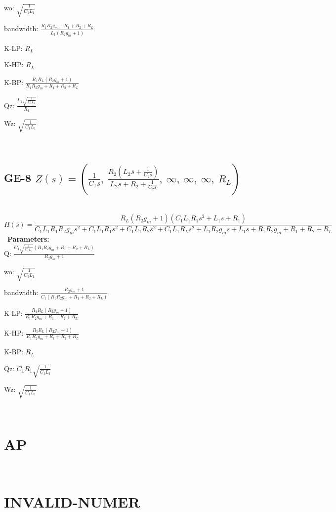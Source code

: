 \documentclass{article}
\begin{document}
wo: $\sqrt{\frac{1}{C_{1} L_{1}}}$\ 

bandwidth: $\frac{R_{1} R_{2} g_{m} + R_{1} + R_{2} + R_{L}}{L_{1} \left(R_{2} g_{m} + 1\right)}$\ 

K-LP: $R_{L}$\ 

K-HP: $R_{L}$\ 

K-BP: $\frac{R_{1} R_{L} \left(R_{2} g_{m} + 1\right)}{R_{1} R_{2} g_{m} + R_{1} + R_{2} + R_{L}}$\ 

Qz: $\frac{L_{1} \sqrt{\frac{1}{C_{1} L_{1}}}}{R_{1}}$\ 

Wz: $\sqrt{\frac{1}{C_{1} L_{1}}}$\ 

\ 

\subsection{GE-8 $Z(s) = \left( \frac{1}{C_{1} s}, \  \frac{R_{2} \left(L_{2} s + \frac{1}{C_{2} s}\right)}{L_{2} s + R_{2} + \frac{1}{C_{2} s}}, \  \infty, \  \infty, \  \infty, \  R_{L}\right)$ } \ 
\textbf{\[H(s) = \frac{R_{L} \left(R_{2} g_{m} + 1\right) \left(C_{1} L_{1} R_{1} s^{2} + L_{1} s + R_{1}\right)}{C_{1} L_{1} R_{1} R_{2} g_{m} s^{2} + C_{1} L_{1} R_{1} s^{2} + C_{1} L_{1} R_{2} s^{2} + C_{1} L_{1} R_{L} s^{2} + L_{1} R_{2} g_{m} s + L_{1} s + R_{1} R_{2} g_{m} + R_{1} + R_{2} + R_{L}}\] } \ 
\textbf{Parameters:}\\ 

Q: $\frac{C_{1} \sqrt{\frac{1}{C_{1} L_{1}}} \left(R_{1} R_{2} g_{m} + R_{1} + R_{2} + R_{L}\right)}{R_{2} g_{m} + 1}$\ 

wo: $\sqrt{\frac{1}{C_{1} L_{1}}}$\ 

bandwidth: $\frac{R_{2} g_{m} + 1}{C_{1} \left(R_{1} R_{2} g_{m} + R_{1} + R_{2} + R_{L}\right)}$\ 

K-LP: $\frac{R_{1} R_{L} \left(R_{2} g_{m} + 1\right)}{R_{1} R_{2} g_{m} + R_{1} + R_{2} + R_{L}}$\ 

K-HP: $\frac{R_{1} R_{L} \left(R_{2} g_{m} + 1\right)}{R_{1} R_{2} g_{m} + R_{1} + R_{2} + R_{L}}$\ 

K-BP: $R_{L}$\ 

Qz: $C_{1} R_{1} \sqrt{\frac{1}{C_{1} L_{1}}}$\ 

Wz: $\sqrt{\frac{1}{C_{1} L_{1}}}$\ 

\ 

\section{AP}\ 
\section{INVALID-NUMER}\ 
\end{document}

